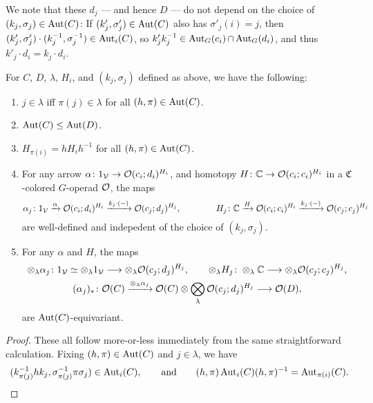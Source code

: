 \documentclass[a4paper,10pt
,draft
]{article}%
\renewcommand{\1}{\eta}%
\begin{document}
\begin{remark}
      We note that these $d_j$ --- and hence $D$ --- do not depend on the choice of $(k_j,\sigma_j) \in \operatorname{Aut}(C)$:
      If $(k'_j, \sigma'_j) \in \operatorname{Aut}(C)$ also has $\sigma'_j(i) = j$, then
      $(k'_j, \sigma'_j) \cdot (k_j^{-1}, \sigma_j^{-1}) \in \operatorname{Aut}_i(C)$,
      so $k'_j k_j^{-1} \in \operatorname{Aut}_G(c_i) \mathop{\cap} \operatorname{Aut}_G(d_i)$,
      and thus $k'_j \cdot d_i = k_j \cdot d_i$.
\end{remark}


\begin{lemma}
      \label{AUTC_LEM}
      For $C$, $D$, $\lambda$, $H_i$, and $(k_j, \sigma_j)$ defined as above, we have the following:
      \begin{enumerate}[label = (\roman*)]
      \item $j \in \lambda$ iff $\pi(j) \in \lambda$ for all $(h,\pi) \in \operatorname{Aut}(C)$.
      \item $\operatorname{Aut}(C) \leq \operatorname{Aut}(D)$.
      \item $H_{\pi(i)} = h H_i h^{-1}$ for all $(h,\pi) \in \operatorname{Aut}(C)$.
      \item For any arrow
            $\alpha \colon 1_{\mathcal V} \to \mathcal{O}(c_i;d_i)^{H_i}$,
            and homotopy
            $H \colon \mathbb C \to \mathcal{O}(c_i;c_i)^{H_i}$
            in a $\mathfrak C$-colored $G$-operad $\mathcal{O}$,
            the maps
            \begin{equation}
                  \alpha_j \colon 1_{\mathcal V} \xrightarrow{\alpha} \mathcal{O}(c_i; d_i)^{H_i} \xrightarrow{ k_j \cdot (-) } \mathcal{O}(c_j; d_j)^{H_j},
                  \qquad \qquad
                  H_j \colon \mathbb C \xrightarrow{H} \mathcal{O}(c_i;c_i)^{H_i} \xrightarrow{k_j \cdot (-)} \mathcal{O}(c_j;c_j)^{H_j}
            \end{equation}
            are well-defined and indepedent of the choice of $(k_j, \sigma_j)$.
      \item For any $\alpha$ and $H$, the maps
            \begin{gather*}
                  \otimes_\lambda \alpha_j \colon 1_\V \simeq \otimes_\lambda 1_\V \longto \otimes_\lambda \O(c_j; d_j)^{H_j},
                  \qquad
                  \otimes_\lambda H_j \colon \otimes_\lambda \mathbb C \longto \otimes_\lambda \O(c_j;c_j)^{H_j},
                  \\
                  (\alpha_j)_{\**} \colon \O(C) \xrightarrow{\otimes_\lambda \alpha_j} \O(C) \otimes \bigotimes_\lambda \O(c_j; d_j)^{H_j} \longto \O(D),
            \end{gather*}
            are $\operatorname{Aut}(C)$-equivariant.
      \end{enumerate}
\end{lemma}
\begin{proof}
      These all follow more-or-less immediately from the same straightforward calculation.
      Fixing $(h,\pi) \in \operatorname{Aut}(C)$ and $j \in \lambda$, we have
      \begin{equation}
            (k_{\pi(j)}^{-1} h k_j, \sigma_{\pi(j)}^{-1} \pi \sigma_j) \in \operatorname{Aut}_i(C),
            \qquad
            \textrm{and}
            \qquad
            (h,\pi) \operatorname{Aut}_i(C) (h,\pi)^{-1} = \operatorname{Aut}_{\pi(i)}(C).
      \end{equation}
\end{proof}
\end{document}
